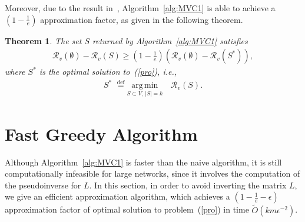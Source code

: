 \documentclass{article}
\def\kh#1{\left( #1 \right)}
\def\defeq{\stackrel{\mathrm{def}}{=}}
\newcommand{\eps}{\epsilon}
\newcommand\LL{\bm{\mathit{L}}}
\newcommand\Otil{\widetilde{O}}
\def\defeq{\stackrel{\mathrm{def}}{=}}
\def\sizeof#1{\left|#1  \right|}
\newtheorem{theorem}[theo]{Theorem}
\begin{document}
Moreover, due to the result in~\cite{nemhauser1978analysis}, Algorithm~\ref{alg:MVC1} is able to achieve a $\left(1 - \frac{1}{e}\right)$  approximation factor, as given in the following theorem.
\begin{theorem}
The set $S$ returned by Algorithm~\ref{alg:MVC1} satisfies
\small
\begin{align*}\label{eq:bound1}
	\mathcal{R}_v(\emptyset) - \mathcal{R}_v(S) \geq \kh{1 - \frac{1}{e}}(\mathcal{R}_v(\emptyset) - \mathcal{R}_v(S^*)),
\end{align*}
\normalsize
where $S^*$ is the optimal solution to~(\ref{pro}), i.e.,
\small
\begin{align*}
	S^* \, \, \defeq \underset{S\subset V,\, \sizeof{S}=k}{\mathrm{arg\,min}} \quad \mathcal{R}_v(S).
\end{align*}
\normalsize
\end{theorem}





\section{Fast Greedy Algorithm}

Although Algorithm~\ref{alg:MVC1} is faster than the naive algorithm, it is still  computationally infeasible for large networks,   since it involves the computation of the pseudoinverse for $\LL$. In this section, in order to avoid inverting the matrix $\LL$, we  give an efficient  approximation algorithm, which achieves a  $\left(1 - \frac{1}{e}-\eps\right)$  approximation factor of optimal solution to  problem~(\ref{pro}) in time $\Otil(km\eps^{-2})$.
\end{document}
